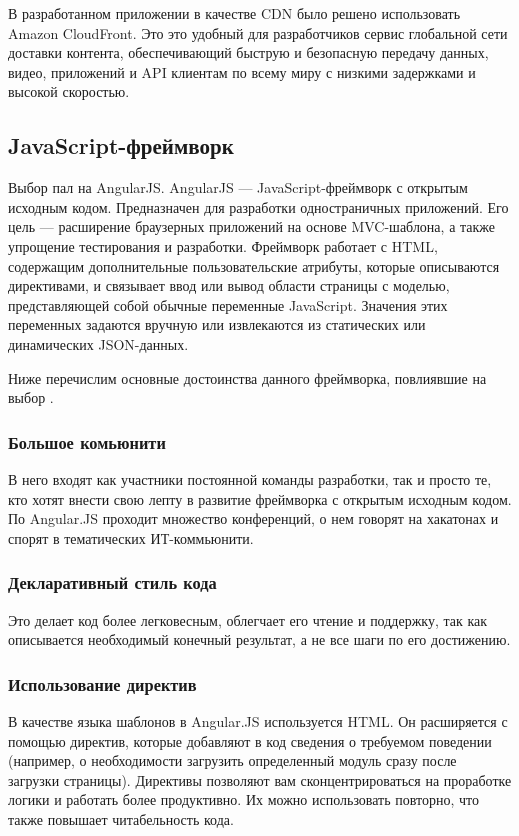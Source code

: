 В разработанном приложении в качестве CDN было решено использовать Amazon CloudFront.
Это это удобный для разработчиков сервис глобальной сети доставки контента, обеспечивающий
быструю и безопасную передачу данных, видео, приложений и API клиентам по всему миру
с низкими задержками и высокой скоростью.

\subsection{JavaScript-фреймворк}

Выбор пал на AngularJS. AngularJS — JavaScript-фреймворк с открытым исходным кодом.
Предназначен для разработки одностраничных приложений. Его цель — расширение браузерных
приложений на основе MVC-шаблона, а также упрощение тестирования и разработки.
Фреймворк работает с HTML, содержащим дополнительные пользовательские атрибуты,
которые описываются директивами, и связывает ввод или вывод области страницы с моделью,
представляющей собой обычные переменные JavaScript. Значения этих переменных задаются
вручную или извлекаются из статических или динамических JSON-данных.

Ниже перечислим основные достоинства данного фреймворка, повлиявшие на выбор \cite{angular}.

\subsubsection*{Большое комьюнити}
В него входят как участники постоянной команды разработки,
так и просто те, кто хотят внести свою лепту в развитие фреймворка с открытым исходным
кодом. По Angular.JS проходит множество конференций, о нем говорят на хакатонах и спорят
в тематических ИТ-коммьюнити.
\subsubsection*{Декларативный стиль кода}
Это делает код более легковесным, облегчает его чтение и поддержку, так как
описывается необходимый конечный результат, а не все шаги по его достижению.
\subsubsection*{Использование директив}
В качестве языка шаблонов в Angular.JS используется HTML. Он расширяется с помощью директив,
которые добавляют в код сведения о требуемом поведении (например, о необходимости загрузить
определенный модуль сразу после загрузки страницы). Директивы позволяют вам сконцентрироваться
на проработке логики и работать более продуктивно. Их можно использовать повторно, что
также повышает читабельность кода.
